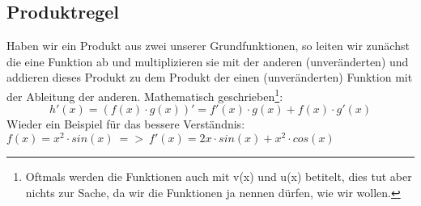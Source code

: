 \subsection{Produktregel}
	Haben wir ein Produkt aus zwei unserer Grundfunktionen, so leiten wir zunächst
	die eine Funktion ab und multiplizieren sie mit der anderen (unveränderten) und
	addieren dieses Produkt zu dem Produkt der einen (unveränderten) Funktion mit
	der Ableitung der anderen. Mathematisch geschrieben\footnote{Oftmals werden die
	Funktionen auch mit v(x) und u(x) betitelt, dies tut aber nichts zur Sache, da
	wir die Funktionen ja nennen dürfen, wie wir wollen.}:
	\[h'(x)=(f(x)\cdot g(x))' = f'(x)\cdot g(x)+f(x)\cdot g'(x)\]
	Wieder ein Beispiel für das bessere Verständnis: \(f(x)=x^2\cdot sin(x)\ =>\
	f'(x)=2x\cdot sin(x)+x^2\cdot cos(x)\)
